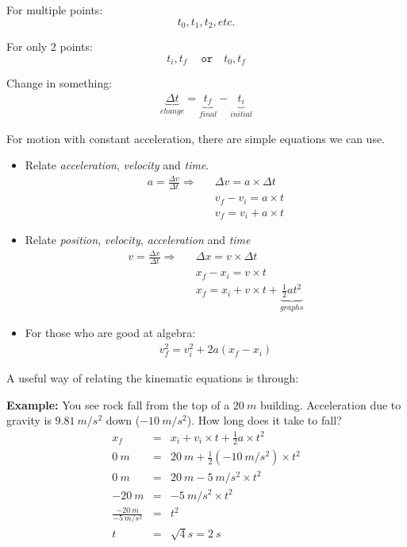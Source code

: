 \documentclass[12pt]{article}
\begin{document}
For multiple points:
\begin{equation}
t_0, t_1, t_2, etc.
\end{equation}

For only 2 points:
\begin{equation}
t_i, t_f ~\quad \texttt{or} \quad t_0, t_f
\end{equation}

Change in something:
\begin{eqnarray}
\underbrace{\Delta t}_{change} = \underbrace{t_f}_{final} - \underbrace{t_i}_{initial}
\end{eqnarray}

For motion with constant acceleration, there are simple equations we can use.

\begin{itemize}
	\item Relate \textit{acceleration}, \textit{velocity} and \textit{time}.
	\begin{eqnarray}
	a = \frac{\Delta v}{\Delta t} \Rightarrow & &\Delta v = a\times \Delta t\\
	& & v_f - v_i = a\times t \\
	& & v_f = v_i + a\times t
	\end{eqnarray}
	\item Relate \textit{position}, \textit{velocity}, \textit{acceleration} and \textit{time}
	\begin{eqnarray}
	v = \frac{\Delta x}{\Delta t} \Rightarrow & & \Delta x = v \times \Delta t \\
	& & x_f - x_i = v\times t \\
	& & x_f = x_i + v\times t +\underbrace{\frac{1}{2}at^2}_{graphs}
	\end{eqnarray}
	\item For those who are good at algebra:
	\begin{eqnarray}
	v_f^2 = v_i^2 + 2a(x_f-x_i)
	\end{eqnarray}
\end{itemize}

\noindent A useful way of relating the kinematic equations is through:
\begin{center}

\end{center}

\noindent \textbf{Example:} You see rock fall from the top of a $20~m$ building. Acceleration due to gravity is $9.81~m/s^2$ down ($-10~m/s^2$). How long does it take to fall?
\begin{eqnarray}
x_f &=& x_i + v_i\times t + \frac{1}{2}a\times t^2 \\ 
0~m &=& 20~m + \frac{1}{2}(-10~m/s^2)\times t^2 \\
0~m &=& 20~m - 5~m/s^2\times t^2 \\
-20~m &=& -5~m/s^2\times t^2 \\
\frac{-20~m}{-5~m/s^2} &=& t^2 \\
t &=& \sqrt{4}s = 2~s
\end{eqnarray}
\end{document}
